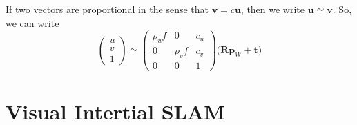 \documentclass{article}
\theoremstyle{definition}
\theoremstyle{remark}
\theoremstyle{definition}
\begin{document}
If two vectors are proportional in the sense that $\mathbf{v} = c \mathbf{u}$, then we write $\mathbf{u} \simeq \mathbf{v}$. So, we can write 
\[\begin{pmatrix} u \\ v \\ 1 \end{pmatrix} \simeq \begin{pmatrix} \rho_u f & 0 & c_u\\ 
0 & \rho_v f & c_v \\ 
0 & 0 & 1 \end{pmatrix} \big( \mathbf{R} \mathbf{p}_W + \mathbf{t} \big)\]

\section{Visual Intertial SLAM}
\end{document}

